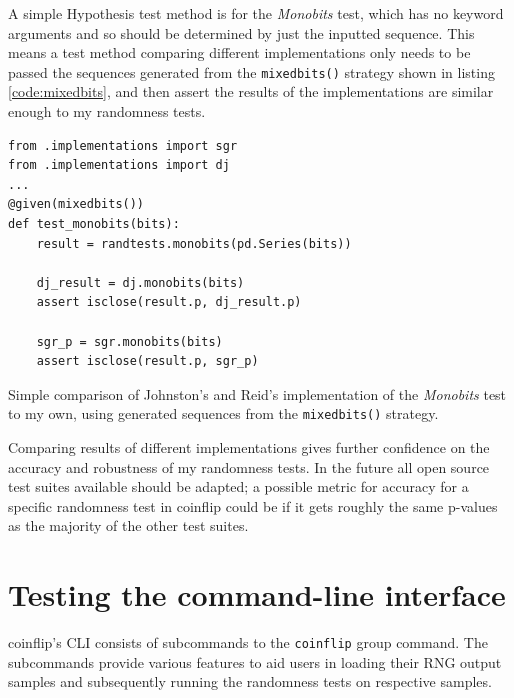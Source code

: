 \documentclass[11pt]{article}
\begin{document}
A simple Hypothesis test method is for the \emph{Monobits} test, which has no keyword arguments and so should be determined by just the inputted sequence. This means a test method comparing different implementations only needs to be passed the sequences generated from the \texttt{mixedbits()} strategy shown in listing \ref{code:mixedbits}, and then assert the results of the implementations are similar enough to my randomness tests.

\begin{listing}[htbp]
\begin{verbatim}
from .implementations import sgr
from .implementations import dj
...
@given(mixedbits())
def test_monobits(bits):
    result = randtests.monobits(pd.Series(bits))

    dj_result = dj.monobits(bits)
    assert isclose(result.p, dj_result.p)

    sgr_p = sgr.monobits(bits)
    assert isclose(result.p, sgr_p)
\end{verbatim}
\caption[Comparing coinflip's \emph{Monobits} implementation to others]{Simple comparison of Johnston's and Reid's implementation of the \emph{Monobits} test to my own, using generated sequences from the \texttt{mixedbits()} strategy.}
\end{listing}

Comparing results of different implementations gives further confidence on the accuracy and robustness of my randomness tests. In the future all open source test suites available should be adapted; a possible metric for accuracy for a specific randomness test in coinflip could be if it gets roughly the same p-values as the majority of the other test suites.

\section{Testing the command-line interface}

coinflip's CLI consists of subcommands to the \texttt{coinflip} group command. The subcommands provide various features to aid users in loading their RNG output samples and subsequently running the randomness tests on respective samples.
\end{document}

